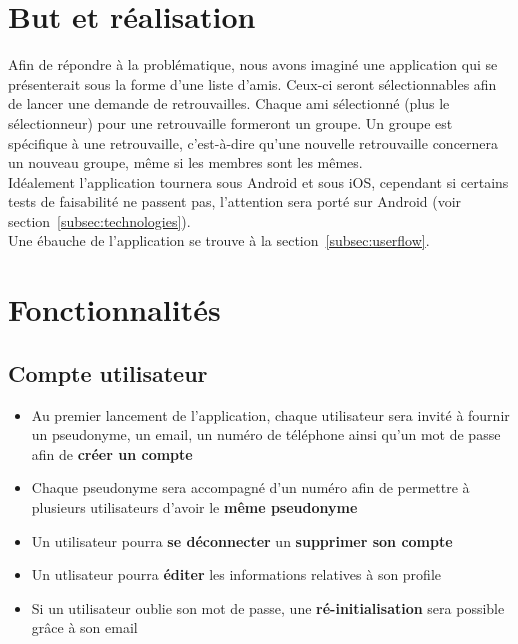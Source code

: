 \documentclass[french]{article}
\begin{document}
	\section{But et réalisation}
		Afin de répondre à la problématique, nous avons imaginé une application qui se présenterait sous la forme d'une liste d'amis. Ceux-ci seront sélectionnables afin de lancer une demande de retrouvailles. Chaque ami sélectionné (plus le sélectionneur) pour une retrouvaille formeront un groupe. Un groupe est spécifique à une retrouvaille, c'est-à-dire qu'une nouvelle retrouvaille concernera un nouveau groupe, même si les membres sont les mêmes.\\
		
		Idéalement l'application tournera sous Android et sous iOS, cependant si certains tests de faisabilité ne passent pas, l'attention sera porté sur Android (voir section~\ref{subsec:technologies}).\\
		
		Une ébauche de l'application se trouve à la section~\ref{subsec:userflow}.
	
	\section{Fonctionnalités}
		\subsection{Compte utilisateur}
			\begin{itemize}
				\item Au premier lancement de l'application, chaque utilisateur sera invité à fournir un pseudonyme, un email, un numéro de téléphone ainsi qu'un mot de passe afin de \textbf{créer un compte} 
				\item Chaque pseudonyme sera accompagné d'un numéro afin de permettre à plusieurs utilisateurs d'avoir le \textbf{même pseudonyme} 
				\item Un utilisateur pourra \textbf{se déconnecter} un \textbf{supprimer son compte}
				\item Un utlisateur pourra \textbf{éditer} les informations relatives à son profile
				\item Si un utilisateur oublie son mot de passe, une \textbf{ré-initialisation} sera possible grâce à son email
			\end{itemize}
	
\end{document}
